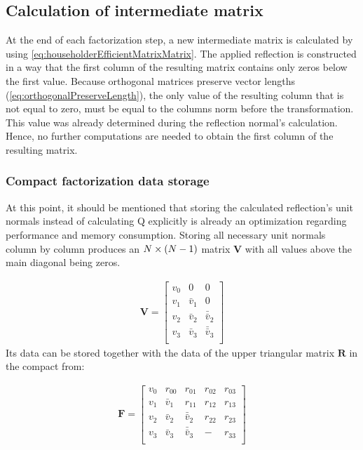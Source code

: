 
\subsection{Calculation of intermediate matrix}
\label{sec:qrOptimizationsFirstColumn}

At the end of each factorization step, a new intermediate matrix is calculated by using \cref{eq:householderEfficientMatrixMatrix}.
The applied reflection is constructed in a way that the first column of the resulting matrix contains only zeros below the first value.
Because orthogonal matrices preserve vector lengths (\cref{eq:orthogonalPreserveLength}), the only value of the resulting column that is not equal to zero, must be equal to the columns norm before the transformation.
This value was already determined during the reflection normal's calculation.
Hence, no further computations are needed to obtain the first column of the resulting matrix.




\subsubsection{Compact factorization data storage}
\label{sec:qrOptimizationsCompactData}

At this point, it should be mentioned that storing the calculated reflection's unit normals instead of calculating Q explicitly is already an optimization regarding performance and memory consumption.
Storing all necessary unit normals column by column produces an $N \times \left(N-1\right)$ matrix $\mathbf{V}$ with all values above the main diagonal being zeros.

\begin{align}
\mathbf{V} = 
\begin{bmatrix}
v_0 & 0         & 0\\
v_1 & \bar{v}_1 & 0\\
v_2 & \bar{v}_2 & \bar{\bar{v}}_2 \\
v_3 & \bar{v}_3 & \bar{\bar{v}}_3 \\
\end{bmatrix}
\end{align}
%
Its data can be stored together with the data of the upper triangular matrix $\mathbf{R}$ in the compact from:

\begin{align}
\mathbf{F} = 
\begin{bmatrix}
	v_0 & r_{00}    & r_{01}          & r_{02} & r_{03} \\
	v_1 & \bar{v}_1 & r_{11}          & r_{12} & r_{13} \\
	v_2 & \bar{v}_2 & \bar{\bar{v}}_2 & r_{22} & r_{23} \\
	v_3 & \bar{v}_3 & \bar{\bar{v}}_3 & -      & r_{33} \\
\end{bmatrix}
\end{align}




